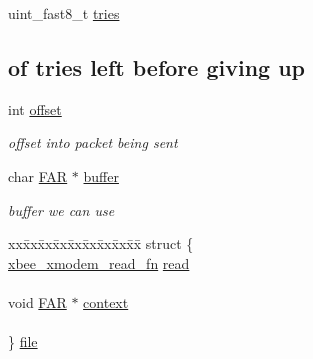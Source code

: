 \begin{DoxyCompactItemize}
uint\+\_\+fast8\+\_\+t \hyperlink{group__util__xmodem_ga8623a9a322bbc93025b7c3337ed8849e}{tries}
\begin{DoxyCompactList}\small\item\em \subsection*{of tries left before giving up}\end{DoxyCompactList}\item 
int \hyperlink{group__util__xmodem_gaed7ea92f45bd273dde380a45ddced592}{offset}
\begin{DoxyCompactList}\small\item\em offset into packet being sent \end{DoxyCompactList}\item 
char \hyperlink{group__hal_gaef060b3456fdcc093a7210a762d5f2ed}{F\+AR} $\ast$ \hyperlink{group__util__xmodem_ga747adede719506ced8838721ed104364}{buffer}
\begin{DoxyCompactList}\small\item\em buffer we can use \end{DoxyCompactList}\item 
\begin{tabbing}
xx\=xx\=xx\=xx\=xx\=xx\=xx\=xx\=xx\=\kill
struct \{\\
\>\hyperlink{group__util__xmodem_ga25f49dbd4c2f9e274a32217a709d6382}{xbee\_xmodem\_read\_fn} \hyperlink{group__util__xmodem_gac73e7e9b654a58e232f8c1380cd68dfa}{read}\\
\>\\
\>void \hyperlink{group__hal_gaef060b3456fdcc093a7210a762d5f2ed}{FAR} $\ast$ \hyperlink{group__util__xmodem_gaa91f8e864e06077c354e5f5216547758}{context}\\
\>\\
\} \hyperlink{group__util__xmodem_ga562f44295cfab2905a4e625861825a59}{file}\\


\end{tabbing}
\end{DoxyCompactItemize}
